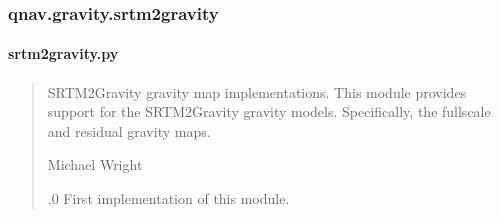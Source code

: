\documentclass[letterpaper,10pt,english]{sphinxmanual}
\begin{document}
\sphinxstepscope


\subsubsection{qnav.gravity.srtm2gravity}
\label{\detokenize{modules/gravity/srtm2gravity:module-qnav.gravity.srtm2gravity}}\label{\detokenize{modules/gravity/srtm2gravity:qnav-gravity-srtm2gravity}}\label{\detokenize{modules/gravity/srtm2gravity::doc}}

\paragraph{srtm2gravity.py}
\label{\detokenize{modules/gravity/srtm2gravity:srtm2gravity-py}}\begin{quote}\begin{description}
\sphinxAtStartPar
SRTM2Gravity gravity map implementations.
This module provides support for the SRTM2Gravity gravity models.
Specifically, the full\sphinxhyphen{}scale and residual gravity maps.

\sphinxAtStartPar
Michael Wright \sphinxhyphen{} 

.0 \sphinxhyphen{} First implementation of this module.

\end{description}\end{quote}
\end{document}
